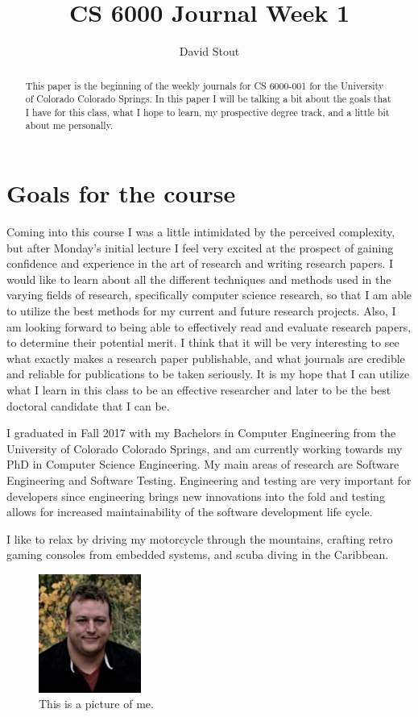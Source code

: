 \documentclass[a4paper]{article}
\title{CS 6000 Journal Week 1}
\author{David Stout}
\begin{document}
\maketitle

\begin{abstract}
This paper is the beginning of the weekly journals for CS 6000-001 for the University of Colorado Colorado 
Springs. In this paper I will be talking a bit about the goals that I have for this class, what I hope to 
learn, my prospective degree track, and a little bit about me personally. 
\end{abstract}

\section{Goals for the course}

Coming into this course I was a little intimidated by the perceived complexity, but after Monday’s initial
lecture I feel very excited at the prospect of gaining confidence and experience in the art of research and writing research papers. I would like to learn about all the different techniques and methods used in the
varying fields of research, specifically computer science research, so that I am able to utilize the best
methods for my current and future research projects. Also, I am looking forward to being able to
effectively read and evaluate research papers, to determine their potential merit. I think that it will be 
very interesting to see what exactly makes a research paper publishable, and what journals are credible and 
reliable for publications to be taken seriously. It is my hope that I can utilize what I learn in this
class to be an effective researcher and later to be the best doctoral candidate that I can be.

I graduated in Fall 2017 with my Bachelors in Computer Engineering from the University of Colorado Colorado
Springs, and am currently working towards my PhD in Computer Science Engineering. My main areas of research are 
Software Engineering and Software Testing. Engineering and testing are very important for developers since 
engineering brings new innovations into the fold and testing allows for increased maintainability of the 
software development life cycle.

I like to relax by driving my motorcycle through the mountains, crafting retro gaming consoles from embedded 
systems, and scuba diving in the Caribbean.

\begin{figure}
\centering
\includegraphics[width=0.3\textwidth]{profile2.jpg}
\caption{\label{fig:Me}This is a picture of me.}
\end{figure}
\end{document}
